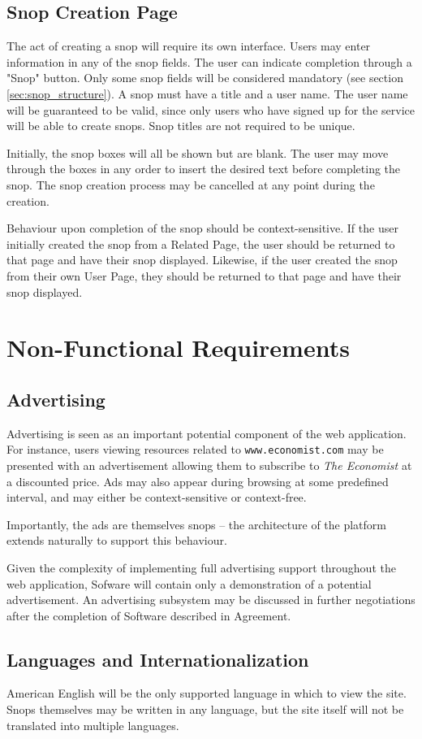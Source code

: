 \documentclass[11pt]{article}
\begin{document}
\subsection{Snop Creation Page}
The act of creating a snop will require its own interface. Users may enter information in any of the snop fields. The user can indicate completion through a "Snop" button. Only some snop fields will be considered mandatory (see section \ref{sec:snop_structure}). A snop must have a title and a user name. The user name will be guaranteed to be valid, since only users who have signed up for the service will be able to create snops. Snop titles are not required to be unique.

Initially, the snop boxes will all be shown but are blank. The user may move through the boxes in any order to insert the desired text before completing the snop. The snop creation process may be cancelled at any point during the creation. 

Behaviour upon completion of the snop should be context-sensitive. If the user initially created the snop from a Related Page, the user should be returned to that page and have their snop displayed. Likewise, if the user created the snop from their own User Page, they should be returned to that page and have their snop displayed.
\section{Non-Functional Requirements}
\subsection{Advertising}
Advertising is seen as an important potential component of the web application. For instance, users viewing resources related to \texttt{www.economist.com} may be presented with an advertisement allowing them to subscribe to {\it The Economist} at a discounted price. Ads may also appear during browsing at some predefined interval, and may either be context-sensitive or context-free. 

Importantly, the ads are themselves snops -- the architecture of the platform extends naturally to support this behaviour.

Given the complexity of implementing full advertising support throughout the web application, Sofware will contain only a demonstration of a potential advertisement. An advertising subsystem may be discussed in further negotiations after the completion of Software described in Agreement.
\subsection{Languages and Internationalization}
American English will be the only supported language in which to view the site. Snops themselves may be written in any language, but the site itself will not be translated into multiple languages.
\end{document}
